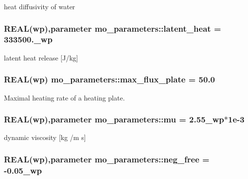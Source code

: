 heat diffusivity of water 

\hypertarget{namespacemo__parameters_ad2928a0d789eeb0407ec6f3756075a18}{
\subsubsection[{latent\_\-heat}]{\setlength{\rightskip}{0pt plus 5cm}REAL({\bf wp}),parameter {\bf mo\_\-parameters::latent\_\-heat} = 333500.\_\-wp}}
\label{namespacemo__parameters_ad2928a0d789eeb0407ec6f3756075a18}


latent heat release \mbox{[}J/kg\mbox{]} 

\hypertarget{namespacemo__parameters_a5bebd9cb4b53f939987065f7ebf4c8b7}{
\subsubsection[{max\_\-flux\_\-plate}]{\setlength{\rightskip}{0pt plus 5cm}REAL({\bf wp}) {\bf mo\_\-parameters::max\_\-flux\_\-plate} = 50.0}}
\label{namespacemo__parameters_a5bebd9cb4b53f939987065f7ebf4c8b7}


Maximal heating rate of a heating plate. 

\hypertarget{namespacemo__parameters_a64a337227f714967ae941ebe24b935ce}{
\subsubsection[{mu}]{\setlength{\rightskip}{0pt plus 5cm}REAL({\bf wp}),parameter {\bf mo\_\-parameters::mu} = 2.55\_\-wp$\ast$1e-\/3}}
\label{namespacemo__parameters_a64a337227f714967ae941ebe24b935ce}


dynamic viscosity \mbox{[}kg /m s\mbox{]} 

\hypertarget{namespacemo__parameters_ad1d58450590f138e7d1116327f563f30}{
\subsubsection[{neg\_\-free}]{\setlength{\rightskip}{0pt plus 5cm}REAL({\bf wp}),parameter {\bf mo\_\-parameters::neg\_\-free} = -\/0.05\_\-wp}}
\label{namespacemo__parameters_ad1d58450590f138e7d1116327f563f30}


